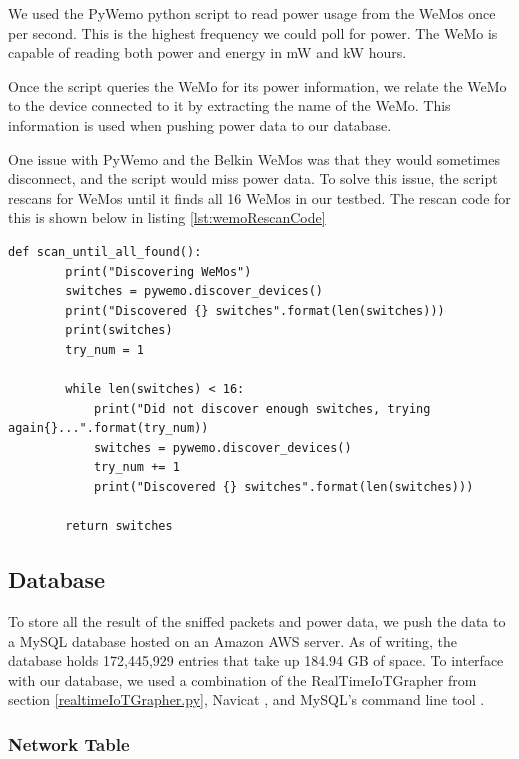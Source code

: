 We used the PyWemo python script \cite{pywemo} to read power usage from the WeMos once per second. This is the highest frequency we could poll for power. The WeMo is capable of reading both power and energy in mW and kW hours.

Once the script queries the WeMo for its power information, we relate the WeMo to the device connected to it by extracting the name of the WeMo. This information is used when pushing power data to our database.

One issue with PyWemo and the Belkin WeMos was that they would sometimes disconnect, and the script would miss power data. To solve this issue, the script rescans for WeMos until it finds all 16 WeMos in our testbed. The rescan code for this is shown below in listing \ref{lst:wemoRescanCode}

\noindent
\begin{minipage}{\textwidth}
\begin{lstlisting}[label={lst:wemoRescanCode},caption={Rescan if all WeMos not found.}]
    def scan_until_all_found():
        print("Discovering WeMos")
        switches = pywemo.discover_devices()
        print("Discovered {} switches".format(len(switches)))
        print(switches)
        try_num = 1

        while len(switches) < 16:
            print("Did not discover enough switches, trying again{}...".format(try_num))
            switches = pywemo.discover_devices()
            try_num += 1
            print("Discovered {} switches".format(len(switches)))

        return switches
\end{lstlisting}
\end{minipage}

\subsection{Database}
\label{Database}

To store all the result of the sniffed packets and power data, we push the data to a MySQL database hosted on an Amazon AWS server. As of writing, the database holds 172,445,929 entries that take up 184.94 GB of space. To interface with our database, we used a combination of the RealTimeIoTGrapher from section \ref{realtimeIoTGrapher.py}, Navicat \cite{navicat}, and MySQL’s command line tool \cite{mysqlCommandline}.

\subsubsection{Network Table}

